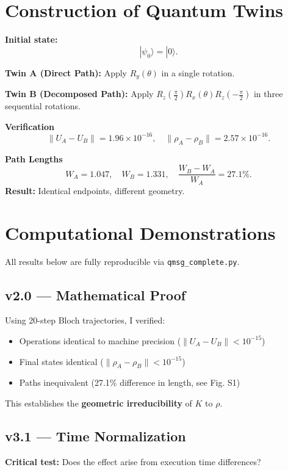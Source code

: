 \documentclass[11pt, onecolumn, letterpaper]{article}
\begin{document}
\section{Construction of Quantum Twins}

\noindent\textbf{Initial state:}
\begin{equation}
|\psi_0\rangle = |0\rangle.
\end{equation}

\noindent\textbf{Twin A (Direct Path):}
Apply $R_y(\theta)$ in a single rotation.

\noindent\textbf{Twin B (Decomposed Path):}
Apply $R_z(\frac{\pi}{2}) R_x(\theta) R_z(-\frac{\pi}{2})$ in three sequential rotations.

\noindent\textbf{Verification}
\begin{equation}
\|U_A - U_B\| = 1.96 \times 10^{-16}, \quad \|\rho_A - \rho_B\| = 2.57 \times 10^{-16}.
\end{equation}

\noindent\textbf{Path Lengths}
\begin{equation}
W_A = 1.047,\quad W_B = 1.331,\quad \frac{W_B - W_A}{W_A} = 27.1\%.
\end{equation}
\textbf{Result:} Identical endpoints, different geometry.

\section{Computational Demonstrations}
All results below are fully reproducible via \texttt{qmsg\_complete.py}.

\subsection{v2.0 --- Mathematical Proof}
Using 20-step Bloch trajectories, I verified:
\begin{itemize}
    \item Operations identical to machine precision ($\|U_A - U_B\| < 10^{-15}$)
    \item Final states identical ($\|\rho_A - \rho_B\| < 10^{-15}$)
    \item Paths inequivalent (27.1\% difference in length, see Fig. S1)
\end{itemize}
This establishes the \textbf{geometric irreducibility} of $K$ to $\rho$.

\subsection{v3.1 --- Time Normalization}
\textbf{Critical test:} Does the effect arise from execution time differences?
\end{document}
